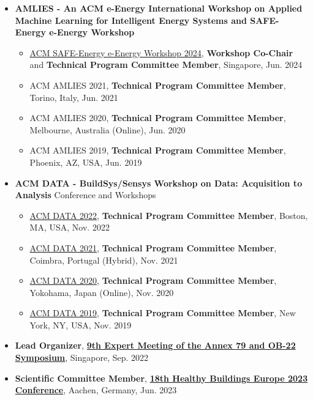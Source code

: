 \documentclass[10pt,a4paper]{article}
\begin{document}
\begin{small}
\begin{itemize}
\item
\textbf{AMLIES - An ACM e-Energy International Workshop on Applied Machine Learning for Intelligent Energy Systems and SAFE-Energy e-Energy Workshop}
\begin{itemize}
\item \href{https://safe-energy-workshop.github.io}{ACM SAFE-Energy e-Energy Workshop 2024}, \textbf{Workshop Co-Chair} and \textbf{Technical Program Committee Member}, Singapore, Jun. 2024
\item ACM AMLIES 2021, \textbf{Technical Program Committee Member}, Torino, Italy, Jun. 2021
\item ACM AMLIES 2020, \textbf{Technical Program Committee Member}, Melbourne, Australia (Online), Jun. 2020
\item ACM AMLIES 2019, \textbf{Technical Program Committee Member}, Phoenix, AZ, USA, Jun. 2019
\end{itemize}

\item
\textbf{ACM DATA - BuildSys/Sensys Workshop on Data: Acquisition to Analysis} Conference and Workshops
\begin{itemize}
\item \href{https://data-workshop.github.io/DATA2022/}{ACM DATA 2022}, \textbf{Technical Program Committee Member}, Boston, MA, USA, Nov. 2022
\item \href{https://data-workshop.github.io/DATA2021/}{ACM DATA 2021}, \textbf{Technical Program Committee Member}, Coimbra, Portugal (Hybrid), Nov. 2021
\item \href{https://workshopdata.github.io/DATA2020/}{ACM DATA 2020}, \textbf{Technical Program Committee Member}, Yokohama, Japan (Online), Nov. 2020
\item \href{https://workshopdata.github.io/DATA2019/}{ACM DATA 2019}, \textbf{Technical Program Committee Member}, New York, NY, USA, Nov. 2019
\end{itemize}


\item
\textbf{Lead Organizer}, \textbf{\href{https://annex79-2022-sg.github.io/}{9th Expert Meeting of the Annex 79 and OB-22 Symposium}}, Singapore, Sep. 2022
\item
\textbf{Scientific Committee Member}, \textbf{\href{https://www.ukaachen.de/kliniken-institute/hb2023-europe/about/welcome-to-hb-europe-2023/}{18th Healthy Buildings Europe 2023 Conference}}, Aachen, Germany, Jun. 2023


\end{itemize}
\end{small}
\end{document}
